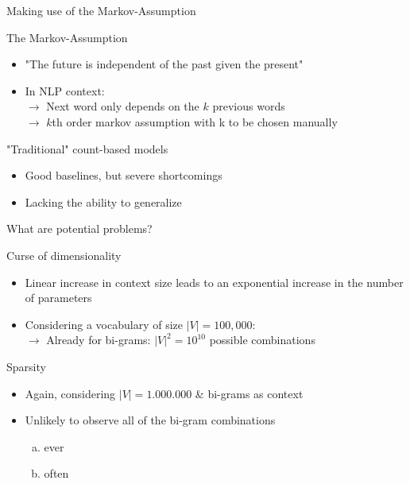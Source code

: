 \documentclass[11pt,compress,t,notes=noshow, xcolor=table]{beamer}
\begin{document}
\begin{frame}{Making use of the Markov-Assumption}

\vfill

\begin{block}{The Markov-Assumption}
    \begin{itemize}
        \item "The future is independent of the past given the present"
        \item In NLP context:\\
        $\rightarrow$ Next word only depends on the $k$ previous words\\
        $\rightarrow$ $k$th order markov assumption with k to be chosen manually
    \end{itemize}
\end{block}
\begin{block}{"Traditional" count-based models}
    \begin{itemize}
        \item Good baselines, but severe shortcomings
        \item Lacking the ability to generalize
    \end{itemize}
\end{block}

\vfill

\end{frame}


\begin{frame}{What are potential problems?}

\vfill

\begin{block}{Curse of dimensionality}
    \begin{itemize}
        \item Linear increase in context size leads to an exponential increase in the number of parameters
        \item Considering a vocabulary of size $|V| = 100,000$:\\
        $\rightarrow$ Already for bi-grams: $|V|^2 = 10^{10}$ possible combinations
    \end{itemize}
\end{block}
\begin{block}{Sparsity}
    \begin{itemize}
        \item Again, considering $|V| = 1.000.000$ \& bi-grams as context
        \item Unlikely to observe all of the bi-gram combinations
        \begin{enumerate}[(a)]
            \item ever
            \item often
        \end{enumerate}
    \end{itemize}
\end{block}

\vfill

\end{frame}
\end{document}
